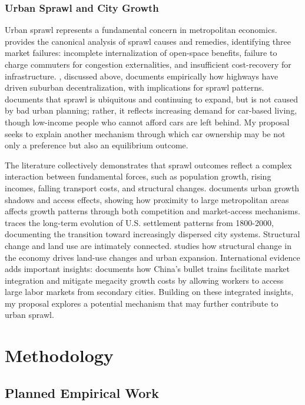 \documentclass[12pt, a4paper]{article}
\begin{document}
\subsubsection{Urban Sprawl and City Growth}

Urban sprawl represents a fundamental concern in metropolitan economics. \citet{Brueckner2000-vd} provides the canonical analysis of sprawl causes and remedies, identifying three market failures: incomplete internalization of open-space benefits, failure to charge commuters for congestion externalities, and insufficient cost-recovery for infrastructure. \citet{Baum-Snow2007-zj}, discussed above, documents empirically how highways have driven suburban decentralization, with implications for sprawl patterns. \citet{Glaeser2003-sr} documents that sprawl is ubiquitous and continuing to expand, but is not caused by bad urban planning; rather, it reflects increasing demand for car-based living, though low-income people who cannot afford cars are left behind. My proposal seeks to explain another mechanism through which car ownership may be not only a preference but also an equilibrium outcome.

The literature collectively demonstrates that sprawl outcomes reflect a complex interaction between fundamental forces, such as population growth, rising incomes, falling transport costs, and structural changes. \citet{Cuberes2021-vo} documents urban growth shadows and access effects, showing how proximity to large metropolitan areas affects growth patterns through both competition and market-access mechanisms. \citet{Desmet2017-kc} traces the long-term evolution of U.S. settlement patterns from 1800-2000, documenting the transition toward increasingly dispersed city systems. Structural change and land use are intimately connected. \citet{Coeurdacier2022-ip} studies how structural change in the economy drives land-use changes and urban expansion. International evidence adds important insights: \citet{Zheng2013-of} documents how China's bullet trains facilitate market integration and mitigate megacity growth costs by allowing workers to access large labor markets from secondary cities. Building on these integrated insights, my proposal explores a potential mechanism that may further contribute to urban sprawl.

\section{Methodology}
\subsection{Planned Empirical Work}
\end{document}
